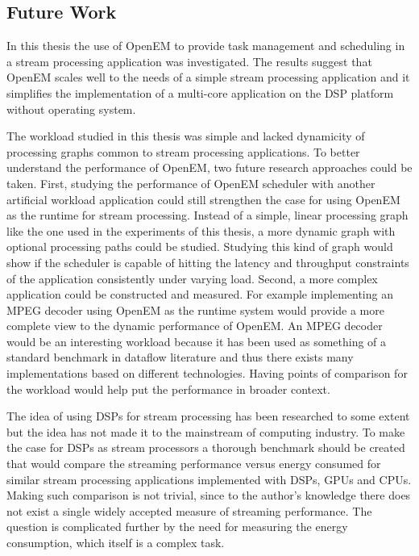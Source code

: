\subsection{Future Work}
\label{subsec:future-work}
In this thesis the use of OpenEM to provide task management and scheduling in a stream processing application was investigated. The results suggest that OpenEM scales well to the needs of a simple stream processing application and it simplifies the implementation of a multi-core application on the DSP platform without operating system.

The workload studied in this thesis was simple and lacked dynamicity of processing graphs common to stream processing applications. To better understand the performance of OpenEM, two future research approaches could be taken. First, studying the performance of OpenEM scheduler with another artificial workload application could still strengthen the case for using OpenEM as the runtime for stream processing. Instead of a simple, linear processing graph like the one used in the experiments of this thesis, a more dynamic graph with optional processing paths could be studied. Studying this kind of graph would show if the scheduler is capable of hitting the latency and throughput constraints of the application consistently under varying load. Second, a more complex application could be constructed and measured. For example implementing an MPEG decoder using OpenEM as the runtime system would provide a more complete view to the dynamic performance of OpenEM. An MPEG decoder would be an interesting workload because it has been used as something of a standard benchmark in dataflow literature and thus there exists many implementations based on different technologies. Having points of comparison for the workload would help put the performance in broader context.

The idea of using DSPs for stream processing has been researched to some extent but the idea has not made it to the mainstream of computing industry. To make the case for DSPs as stream processors a thorough benchmark should be created that would compare the streaming performance versus energy consumed for similar stream processing applications implemented with DSPs, GPUs and CPUs. Making such comparison is not trivial, since to the author's knowledge there does not exist a single widely accepted measure of streaming performance. The question is complicated further by the need for measuring the energy consumption, which itself is a complex task.

